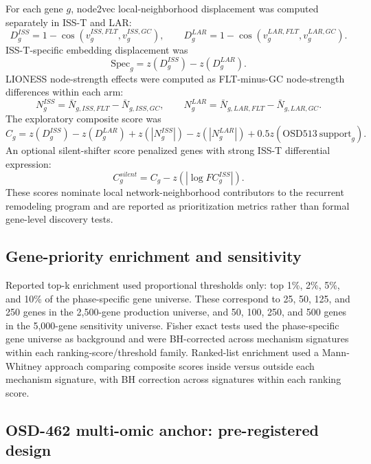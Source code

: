 \documentclass[11pt]{article}
\begin{document}
For each gene $g$, node2vec local-neighborhood displacement was computed separately in ISS-T and LAR:
\begin{equation}
D_g^{ISS}=1-\cos(v^{ISS,FLT}_g,v^{ISS,GC}_g),
\qquad
D_g^{LAR}=1-\cos(v^{LAR,FLT}_g,v^{LAR,GC}_g).
\end{equation}
ISS-T-specific embedding displacement was
\begin{equation}
\mathrm{Spec}_g=z(D_g^{ISS})-z(D_g^{LAR}).
\end{equation}
LIONESS node-strength effects were computed as FLT-minus-GC node-strength differences within each arm:
\begin{equation}
N_g^{ISS}=\bar{N}_{g,ISS,FLT}-\bar{N}_{g,ISS,GC},
\qquad
N_g^{LAR}=\bar{N}_{g,LAR,FLT}-\bar{N}_{g,LAR,GC}.
\end{equation}
The exploratory composite score was
\begin{equation}
C_g=z(D_g^{ISS})-z(D_g^{LAR})+z(|N_g^{ISS}|)-z(|N_g^{LAR}|)+0.5z(\mathrm{OSD513\ support}_g).
\end{equation}
An optional silent-shifter score penalized genes with strong ISS-T differential expression:
\begin{equation}
C^{silent}_g=C_g-z(|\log FC_g^{ISS}|).
\end{equation}
These scores nominate local network-neighborhood contributors to the recurrent remodeling program and are reported as prioritization metrics rather than formal gene-level discovery tests.

\subsection{Gene-priority enrichment and sensitivity}

Reported top-k enrichment used proportional thresholds only: top 1\%, 2\%, 5\%, and 10\% of the phase-specific gene universe. These correspond to 25, 50, 125, and 250 genes in the 2,500-gene production universe, and 50, 100, 250, and 500 genes in the 5,000-gene sensitivity universe. Fisher exact tests used the phase-specific gene universe as background and were BH-corrected across mechanism signatures within each ranking-score/threshold family. Ranked-list enrichment used a Mann-Whitney approach comparing composite scores inside versus outside each mechanism signature, with BH correction across signatures within each ranking score.

\subsection{OSD-462 multi-omic anchor: pre-registered design}
\end{document}
